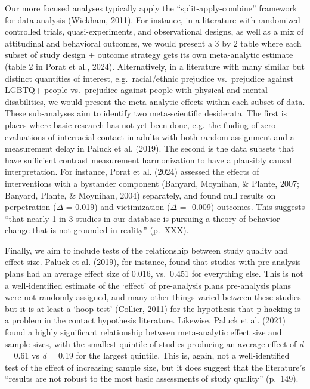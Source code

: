 \documentclass[
  man]{apa6}
\begin{document}
Our more focused analyses typically apply the ``split-apply-combine'' framework for data analysis (Wickham, 2011). For instance, in a literature with randomized controlled trials, quasi-experiments, and observational designs, as well as a mix of attitudinal and behavioral outcomes, we would present a 3 by 2 table where each subset of study design + outcome strategy gets its own meta-analytic estimate (table 2 in Porat et al., 2024). Alternatively, in a literature with many similar but distinct quantities of interest, e.g.~racial/ethnic prejudice vs.~prejudice against LGBTQ+ people vs.~prejudice against people with physical and mental disabilities, we would present the meta-analytic effects within each subset of data. These sub-analyses aim to identify two meta-scientific desiderata. The first is places where basic research has not yet been done, e.g.~the finding of zero evaluations of interracial contact in adults with both random assignment and a measurement delay in Paluck et al. (2019). The second is the data subsets that have sufficient contrast measurement harmonization to have a plausibly causal interpretation. For instance, Porat et al. (2024) assessed the effects of interventions with a bystander component (Banyard, Moynihan, \& Plante, 2007; Banyard, Plante, \& Moynihan, 2004) separately, and found null results on perpetration (\(\Delta\) = 0.019) and victimization (\(\Delta\) = -0.009) outcomes. This suggests ``that nearly 1 in 3 studies in our database is pursuing a theory of behavior change that is not grounded in reality'' (p.~XXX).

Finally, we aim to include tests of the relationship between study quality and effect size. Paluck et al. (2019), for instance, found that studies with pre-analysis plans had an average effect size of 0.016, vs.~0.451 for everything else. This is not a well-identified estimate of the `effect' of pre-analysis plans \textemdash pre-analysis plans were not randomly assigned, and many other things varied between these studies \textemdash but it is at least a `hoop test' (Collier, 2011) for the hypothesis that p-hacking is a problem in the contact hypothesis literature. Likewise, Paluck et al. (2021) found a highly significant relationship between meta-analytic effect size and sample sizes, with the smallest quintile of studies producing an average effect of \emph{d} = 0.61 vs \emph{d} = 0.19 for the largest quintile. This is, again, not a well-identified test of the effect of increasing sample size, but it does suggest that the literature's ``results are not robust to the most basic assessments of study quality'' (p.~149).
\end{document}
